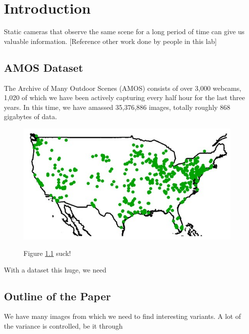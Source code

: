 \chapter{Introduction}
\label{cpt:intro}

Static cameras that observe the same scene for a long period of time can give us valuable information.  [Reference other work done by people in this lab]



\section{AMOS Dataset}

The Archive of Many Outdoor Scenes (AMOS) consists of over 3,000 webcams, 1,020 of which we have been actively capturing every half hour for the last three years.  In this time, we have amassed 35,376,886 images, totally roughly 868 gigabytes of data.

\begin{figure}[ht]
\centering
\includegraphics[width = 1\textwidth]{figures/localizationMap.jpg}
\label{fig:localizationMap}
\caption[Map]{Figure \ref{fig:localizationMap} suck!}
\end{figure}

With a dataset this huge, we need

\section{Outline of the Paper}

We have many images from which we need to find interesting variants.  A lot of the variance is controlled, be it through 




